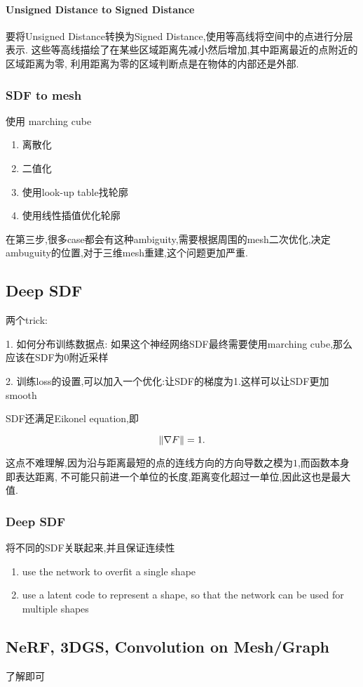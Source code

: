 \paragraph{Unsigned Distance to Signed Distance}
要将Unsigned Distance转换为Signed Distance,使用等高线将空间中的点进行分层表示.
这些等高线描绘了在某些区域距离先减小然后增加,其中距离最近的点附近的区域距离为零,
利用距离为零的区域判断点是在物体的内部还是外部.

\subsubsection{SDF to mesh}

使用 marching cube

\begin{enumerate}
    \item 离散化
    \item 二值化
    \item 使用look-up table找轮廓
    \item 使用线性插值优化轮廓
\end{enumerate}

在第三步,很多case都会有这种ambiguity,需要根据周围的mesh二次优化,决定ambuguity的位置,对于三维mesh重建,这个问题更加严重.

\subsection{Deep SDF}

两个trick:

1. 如何分布训练数据点: 如果这个神经网络SDF最终需要使用marching cube,那么应该在SDF为0附近采样

2. 训练loss的设置,可以加入一个优化:让SDF的梯度为1.这样可以让SDF更加smooth

SDF还满足Eikonel equation,即

\begin{equation}
    \left \Vert \nabla F \right \Vert = 1.
\end{equation}

这点不难理解,因为沿与距离最短的点的连线方向的方向导数之模为$1$,而函数本身即表达距离,
不可能只前进一个单位的长度,距离变化超过一单位,因此这也是最大值.

\subsubsection{Deep SDF}

将不同的SDF关联起来,并且保证连续性\cite{Park2019CVPR}

\begin{enumerate}
    \item  use the network to overfit a single shape
    \item use a latent code to represent a shape, so that the
    network can be used for multiple shapes
\end{enumerate}

\subsection{NeRF, 3DGS, Convolution on Mesh/Graph}

了解即可